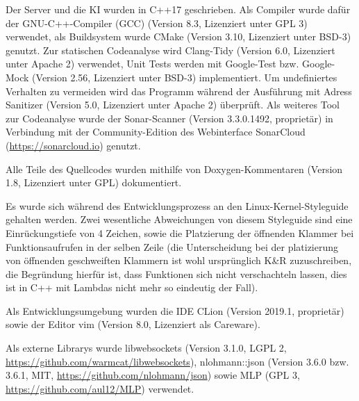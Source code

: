 Der Server und die KI wurden in C++17 geschrieben.
Als Compiler wurde dafür der GNU-C++-Compiler (GCC) (Version 8.3, Lizenziert unter GPL 3) verwendet,
als Buildsystem wurde CMake (Version 3.10, Lizenziert unter BSD-3) genutzt.
Zur statischen Codeanalyse wird Clang-Tidy (Version 6.0, Lizenziert unter Apache 2) verwendet,
Unit Tests werden mit Google-Test bzw. Google-Mock (Version 2.56, Lizenziert unter BSD-3) implementiert.
Um undefiniertes Verhalten zu vermeiden wird das Programm während der Ausführung mit Adress Sanitizer (Version 5.0, Lizenziert unter Apache 2) überprüft.
Als weiteres Tool zur Codeanalyse wurde der Sonar-Scanner (Version 3.3.0.1492, proprietär) in Verbindung mit der Community-Edition des Webinterface SonarCloud (\url{https://sonarcloud.io}) genutzt.

Alle Teile des Quellcodes wurden mithilfe von Doxygen-Kommentaren (Version 1.8, Lizenziert unter GPL) dokumentiert.

Es wurde sich während des Entwicklungsprozess an den Linux-Kernel-Styleguide gehalten werden. Zwei wesentliche Abweichungen von diesem Styleguide sind eine Einrückungstiefe von 4 Zeichen, sowie die Platzierung der öffnenden Klammer bei Funktionsaufrufen in der selben Zeile (die Unterscheidung bei der platizierung von öffnenden geschweiften Klammern ist wohl ursprünglich K\&R zuzuschreiben, die Begründung hierfür ist, dass Funktionen sich nicht verschachteln lassen, dies
ist in C++ mit Lambdas nicht mehr so eindeutig der Fall).

Als Entwicklungsumgebung wurden die IDE CLion (Version 2019.1, proprietär) sowie der Editor vim (Version 8.0, Lizenziert als Careware).

Als externe Librarys wurde libwebsockets (Version 3.1.0, LGPL 2, \url{https://github.com/warmcat/libwebsockets}), 
nlohmann::json (Version 3.6.0 bzw. 3.6.1, MIT, \url{https://github.com/nlohmann/json}) sowie 
MLP (GPL 3, \url{https://github.com/aul12/MLP}) verwendet.
